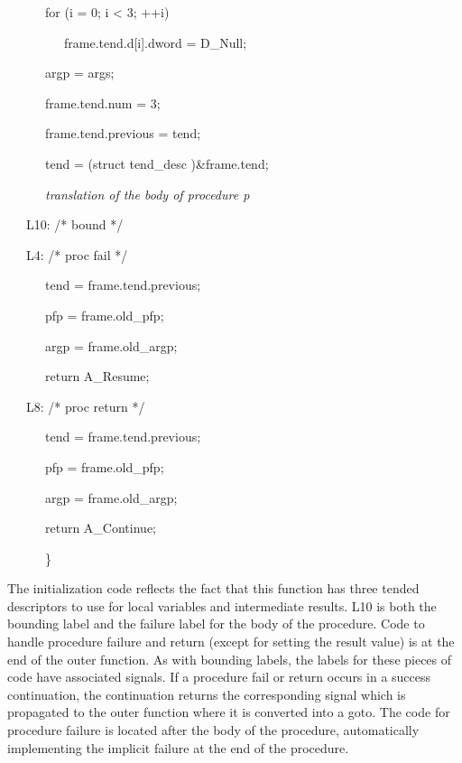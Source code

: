 \bigskip

{\ttfamily\mdseries
\ \ \ \ \ \ for (i = 0; i {\textless} 3; ++i)}

{\ttfamily\mdseries
\ \ \ \ \ \ \ \ \ frame.tend.d[i].dword = D\_Null;}

{\ttfamily\mdseries
\ \ \ \ \ \ argp = args;}

{\ttfamily\mdseries
\ \ \ \ \ \ frame.tend.num = 3;}

{\ttfamily\mdseries
\ \ \ \ \ \ frame.tend.previous = tend;}

{\ttfamily\mdseries
\ \ \ \ \ \ tend = (struct tend\_desc )\&frame.tend;}


\bigskip

{\ttfamily\mdseries
\ \ \ \ \ \ \textit{translation of the body of procedure p}}


\bigskip

{\ttfamily\mdseries
\ \ \ L10: /* bound */}

{\ttfamily\mdseries
\ \ \ L4: /* proc fail */}

{\ttfamily\mdseries
\ \ \ \ \ \ tend = frame.tend.previous;}

{\ttfamily\mdseries
\ \ \ \ \ \ pfp = frame.old\_pfp;}

{\ttfamily\mdseries
\ \ \ \ \ \ argp = frame.old\_argp;}

{\ttfamily\mdseries
\ \ \ \ \ \ return A\_Resume;}

{\ttfamily\mdseries
\ \ \ L8: /* proc return */}

{\ttfamily\mdseries
\ \ \ \ \ \ tend = frame.tend.previous;}

{\ttfamily\mdseries
\ \ \ \ \ \ pfp = frame.old\_pfp;}

{\ttfamily\mdseries
\ \ \ \ \ \ argp = frame.old\_argp;}

{\ttfamily\mdseries
\ \ \ \ \ \ return A\_Continue;}

{\ttfamily\mdseries
\ \ \ \ \ \ \}}


The initialization code reflects the fact that this function has three
tended descriptors to use for local variables and intermediate
results. L10 is both the bounding label and the failure label for the
body of the procedure. Code to handle procedure failure and return
(except for setting the result value) is at the end of the outer
function. As with bounding labels, the labels for these pieces of code
have associated signals. If a procedure fail or return occurs in a
success continuation, the continuation returns the corresponding
signal which is propagated to the outer function where it is converted
into a goto. The code for procedure failure is located after the body
of the procedure, automatically implementing the implicit failure at
the end of the procedure.


